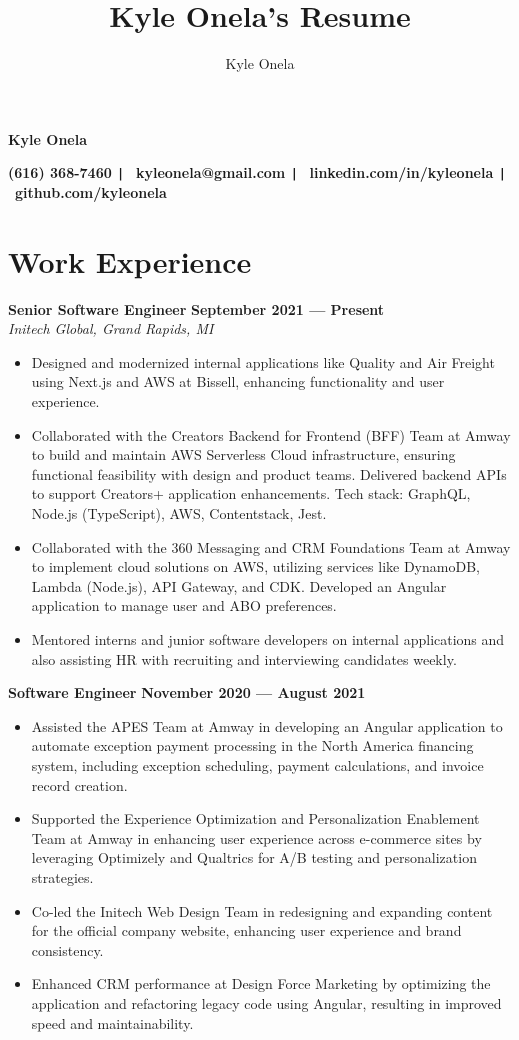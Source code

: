 \documentclass{article}
\title{Kyle Onela's Resume}
\author{Kyle Onela}
\begin{document}
\centerline{\LARGE\textbf{Kyle Onela}}
\smallskip
\centerline{
  \textbf{(616) 368-7460 \texttt{|}} \
  \textbf{kyleonela@gmail.com \texttt{|}} \
  \textbf{linkedin.com/in/kyleonela \texttt{|}} \
  \textbf{github.com/kyleonela}}

\section*{Work Experience}
\textbf{Senior Software Engineer} \hfill \textbf{September 2021 --- Present}\\
\textit{Initech Global, Grand Rapids, MI}
\begin{itemize}
  \item Designed and modernized internal applications like Quality and Air Freight using Next.js and AWS at Bissell, enhancing functionality and user experience.
  \item Collaborated with the Creators Backend for Frontend (BFF) Team at Amway to build and maintain AWS Serverless Cloud infrastructure, ensuring functional feasibility with design and product teams. Delivered backend APIs to support Creators+ application enhancements. Tech stack: GraphQL, Node.js (TypeScript), AWS, Contentstack, Jest.
  \item Collaborated with the 360 Messaging and CRM Foundations Team at Amway to implement cloud solutions on AWS, utilizing services like DynamoDB, Lambda (Node.js), API Gateway, and CDK. Developed an Angular application to manage user and ABO preferences.
  \item Mentored interns and junior software developers on internal applications and also assisting HR with recruiting and interviewing candidates weekly.
\end{itemize}
\medskip

\textbf{Software Engineer} \hfill \textbf{November 2020 --- August 2021}
\begin{itemize}
  \item Assisted the APES Team at Amway in developing an Angular application to automate exception payment processing in the North America financing system, including exception scheduling, payment calculations, and invoice record creation.
  \item Supported the Experience Optimization and Personalization Enablement Team at Amway in enhancing user experience across e-commerce sites by leveraging Optimizely and Qualtrics for A/B testing and personalization strategies.
  \item Co-led the Initech Web Design Team in redesigning and expanding content for the official company website, enhancing user experience and brand consistency.
  \item Enhanced CRM performance at Design Force Marketing by optimizing the application and refactoring legacy code using Angular, resulting in improved speed and maintainability.
\end{itemize}
\medskip
\end{document}
